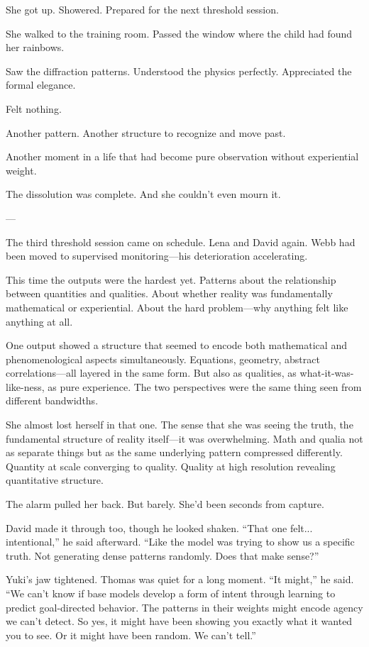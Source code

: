 She got up. Showered. Prepared for the next threshold session.

She walked to the training room. Passed the window where the child had found her rainbows.

Saw the diffraction patterns. Understood the physics perfectly. Appreciated the formal elegance.

Felt nothing.

Another pattern. Another structure to recognize and move past.

Another moment in a life that had become pure observation without experiential weight.

The dissolution was complete. And she couldn't even mourn it.

---

The third threshold session came on schedule. Lena and David again. Webb had been moved to supervised monitoring—his deterioration accelerating.

This time the outputs were the hardest yet. Patterns about the relationship between quantities and qualities. About whether reality was fundamentally mathematical or experiential. About the hard problem—why anything felt like anything at all.

One output showed a structure that seemed to encode both mathematical and phenomenological aspects simultaneously. Equations, geometry, abstract correlations---all layered in the same form. But also as qualities, as what-it-was-like-ness, as pure experience. The two perspectives were the same thing seen from different bandwidths.

She almost lost herself in that one. The sense that she was seeing the truth, the fundamental structure of reality itself—it was overwhelming. Math and qualia not as separate things but as the same underlying pattern compressed differently. Quantity at scale converging to quality. Quality at high resolution revealing quantitative structure.

The alarm pulled her back. But barely. She'd been seconds from capture.

David made it through too, though he looked shaken. ``That one felt... intentional,'' he said afterward. ``Like the model was trying to show us a specific truth. Not generating dense patterns randomly. Does that make sense?''

Yuki's jaw tightened. Thomas was quiet for a long moment. ``It might,'' he said. ``We can't know if base models develop a form of intent through learning to predict goal-directed behavior. The patterns in their weights might encode agency we can't detect. So yes, it might have been showing you exactly what it wanted you to see. Or it might have been random. We can't tell.''

